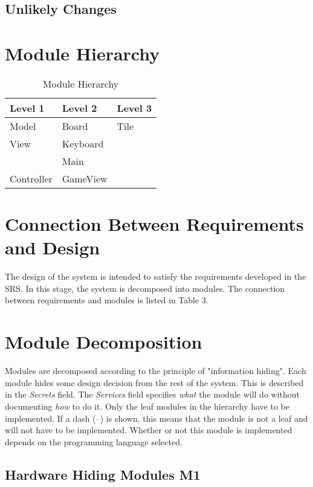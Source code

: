 \documentclass[12pt]{article}
\begin{document}
\subsection{Unlikely Changes}

\section{Module Hierarchy}
\begin{table}[!htbp]
	\centering
	\begin{tabular}{p{4cm}|p{4cm}|p{4cm}}
		\textbf{Level 1} & \textbf{Level 2} & \textbf{Level 3} \\\hline
		Model & Board & Tile \\\hline
		View & Keyboard &  \\
		& Main &  \\\hline
		Controller & GameView & \\
	\end{tabular}
	\smallskip
	\caption{Module Hierarchy}
	\label{Module Hierarchy}
\end{table}

\section{Connection Between Requirements and Design}
The design of the system is intended to satisfy the requirements developed in the SRS. In this stage, the system is decomposed into modules. The connection between requirements and modules is listed in Table 3.

\section{Module Decomposition}
Modules are decomposed according to the principle of "information hiding". Each module hides some design decision from the rest of the system. This is described in the \textit{Secrets} field. The \textit{Services} field specifies \textit{what} the module will do without documenting \textit{how} to do it. Only the leaf modules in the hierarchy have to be implemented. If a dash (\emph{--}) is shown, this means that the module is not a leaf and will not have to be implemented. Whether or not this module is implemented depends on the programming language selected.

\subsection{Hardware Hiding Modules \textbf{M1}}
\end{document}
